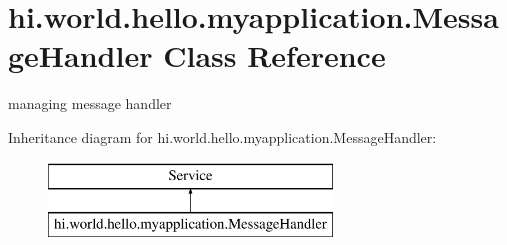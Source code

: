 \hypertarget{classhi_1_1world_1_1hello_1_1myapplication_1_1_message_handler}{}\section{hi.\+world.\+hello.\+myapplication.\+Message\+Handler Class Reference}
\label{classhi_1_1world_1_1hello_1_1myapplication_1_1_message_handler}


managing message handler  


Inheritance diagram for hi.\+world.\+hello.\+myapplication.\+Message\+Handler\+:\begin{figure}[H]
\begin{center}
\leavevmode
\includegraphics[height=2.000000cm]{classhi_1_1world_1_1hello_1_1myapplication_1_1_message_handler}
\end{center}
\end{figure}
